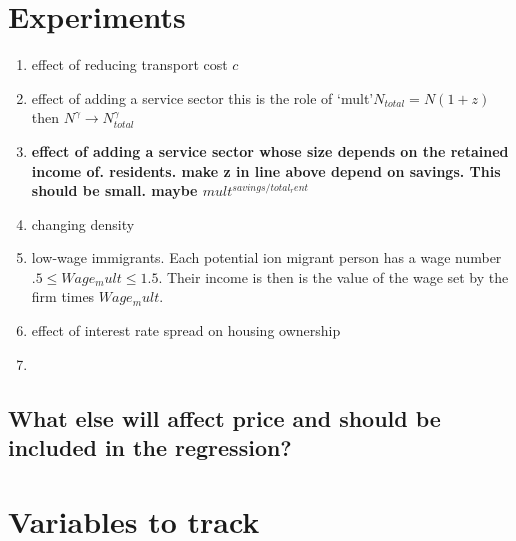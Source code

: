 \section{Experiments}
  \begin{enumerate}
    \item effect of reducing transport cost $c$
    \item {\color{red}effect of adding a service sector  this is the role of `mult'}$N_{total} = N(1+z)$ then $N^\gamma \rightarrow  N_{total}^\gamma$
    \item \textbf{effect of adding a service sector whose size depends on the retained income of. residents. {\color{red} make z in line above depend on savings. This should be small. maybe $mult^{savings/total_rent}$}}
    \item changing density
    \item low-wage immigrants. {\color{red}Each potential ion migrant person has a wage number $.5
    \leq Wage_mult\leq1.5$. Their income is then is the value of the wage set by the firm times $Wage_mult$.}
    \item effect of interest rate spread on housing ownership
    \item 
   
\end{enumerate} 
    
\subsection{What else will affect price and should be included in the regression?}

\newcommand{\num}{\addtocounter{foo}{1}\thefoo. &}
\newcommand{\Rnum}{\addtocounter{foo}{1}\thefoo. &\vspace{-.3cm}\color{red} }
\section{Variables to track}

